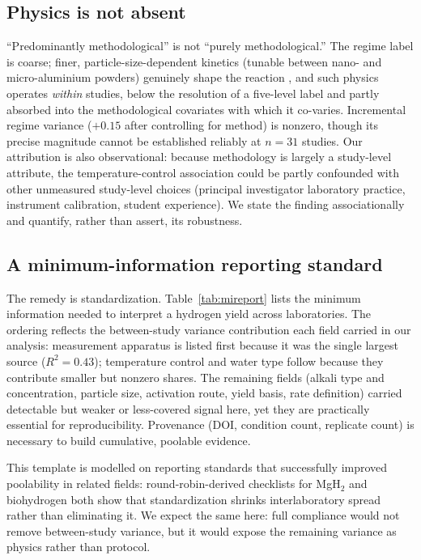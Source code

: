 \subsection{Physics is not absent}

``Predominantly methodological'' is not ``purely methodological.'' The regime label is
coarse; finer, particle-size-dependent kinetics (tunable between nano- and
micro-aluminium powders) genuinely shape the reaction \citep{saceleanu2019}, and such
physics operates \emph{within} studies, below the resolution of a five-level label and
partly absorbed into the methodological covariates with which it co-varies. Incremental
regime variance ($+0.15$ after controlling for method) is nonzero, though its precise
magnitude cannot be established reliably at $n\!=\!31$ studies.
Our attribution is also observational: because methodology is largely a study-level
attribute, the temperature-control association could be partly confounded with other
unmeasured study-level choices (principal investigator laboratory practice, instrument
calibration, student experience). We state the finding associationally and quantify,
rather than assert, its robustness.

\subsection{A minimum-information reporting standard}

The remedy is standardization. Table~\ref{tab:mireport} lists the minimum information
needed to interpret a hydrogen yield across laboratories. The ordering reflects the
between-study variance contribution each field carried in our analysis: measurement
apparatus is listed first because it was the single largest source ($R^2\!=\!0.43$);
temperature control and water type follow because they contribute smaller but nonzero
shares. The remaining fields (alkali type and concentration, particle size, activation
route, yield basis, rate definition) carried detectable but weaker or less-covered
signal here, yet they are practically essential for reproducibility. Provenance (DOI,
condition count, replicate count) is necessary to build cumulative, poolable evidence.

This template is modelled on reporting standards that successfully improved poolability
in related fields: round-robin-derived checklists for MgH$_2$ \citep{wulf2021} and
biohydrogen \citep{hoque2018} both show that standardization shrinks interlaboratory
spread rather than eliminating it. We expect the same here: full compliance would not
remove between-study variance, but it would expose the remaining variance as physics
rather than protocol.

